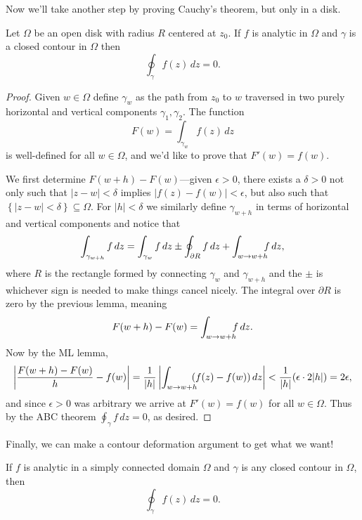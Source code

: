 \documentclass[../m136main.tex]{subfiles}
\begin{document}
Now we'll take another step by proving Cauchy's theorem, but only in a disk.

\begin{lemma}
    Let $\Omega$ be an open disk with radius $R$ centered at $z_0$.
    If $f$ is analytic in $\Omega$ and $\gamma$ is a closed contour in $\Omega$ then
    \[ \oint_\gamma f(z) \,dz = 0. \]
\end{lemma}

\begin{proof}
    Given $w \in \Omega$ define $\gamma_w$ as the path from $z_0$ to $w$ traversed in two purely horizontal and vertical components $\gamma_1, \gamma_2$.
    The function
    \[ F(w) = \int_{\gamma_w} f(z) \,dz \]
    is well-defined for all $w \in \Omega$, and we'd like to prove that $F'(w) = f(w)$.

    We first determine $F(w+h) - F(w)$---given $\epsilon > 0$, there exists a $\delta > 0$ not only such that $|z-w| < \delta$ implies $|f(z) - f(w)| < \epsilon$, but also such that $\left\{ |z-w| < \delta \right\} \subseteq \Omega$.
    For $|h| < \delta$ we similarly define $\gamma_{w+h}$ in terms of horizontal and vertical components and notice that
    \[ \int_{\gamma_{w+h}} f \,dz = \int_{\gamma_w} f \,dz \pm \oint_{\partial R} f \,dz + \int_{w \to w+h} \hspace{-6pt} f \,dz, \]
    where $R$ is the rectangle formed by connecting $\gamma_w$ and $\gamma_{w+h}$ and the $\pm$ is whichever sign is needed to make things cancel nicely.
    The integral over $\partial R$ is zero by the previous lemma, meaning
    \[ F(w+h) - F(w) = \int_{w \to w+h} \hspace{-6pt} f \,dz. \]
    Now by the ML lemma,
    \[ \left| \frac{F(w+h) - F(w)}{h} - f(w) \right| = \frac{1}{|h|} \left| \int_{w \to w+h} \hspace{-6pt} (f(z) - f(w)) \,dz \right| < \frac{1}{|h|} (\epsilon \cdot 2|h|) = 2\epsilon, \]
    and since $\epsilon > 0$ was arbitrary we arrive at $F'(w) = f(w)$ for all $w \in \Omega$.
    Thus by the ABC theorem $\oint_\gamma f \,dz = 0$, as desired.
\end{proof}

Finally, we can make a contour deformation argument to get what we want!

\pagebreak

\begin{theorem}
    If $f$ is analytic in a simply connected domain $\Omega$ and $\gamma$ is any closed contour in $\Omega$, then
    \[ \oint_\gamma f(z) \,dz = 0. \]
\end{theorem}
\end{document}
